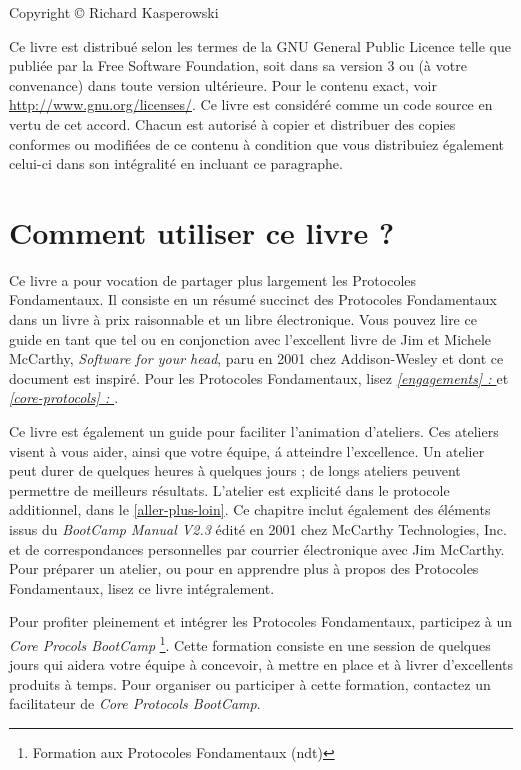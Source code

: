 \documentclass{book}
\newcommand*{\numref}[1]{{\hyperref[{#1}]{\autoref*{#1}}}}
\newcommand*{\fullref}[1]{\textit{\hyperref[{#1}]{\autoref*{#1} : \nameref*{#1}}}}
\begin{document}
Copyright \copyright{} Richard Kasperowski

Ce livre est distribué selon les termes de la GNU General Public Licence telle que publiée par la Free Software 
Foundation, soit dans sa version 3 ou (à votre convenance) dans toute version ultérieure. Pour le contenu exact, voir
\url{http://www.gnu.org/licenses/}. Ce livre est considéré comme un code source en vertu de cet accord. Chacun est autorisé
à copier et distribuer des copies conformes ou modifiées de ce contenu à condition que vous distribuiez également celui-ci
dans son intégralité en incluant ce paragraphe. 

\mainmatter

\chapter{Comment utiliser ce livre ?} \label{utiliser-ce-livre}

Ce livre a pour vocation de partager plus largement les Protocoles Fondamentaux. Il consiste en un résumé succinct des 
Protocoles Fondamentaux dans un livre à prix raisonnable et un libre électronique. Vous pouvez lire ce guide en tant que 
tel ou en conjonction avec l'excellent livre de Jim et Michele McCarthy, \emph{Software for your head}, paru en 2001
chez Addison-Wesley et dont ce document est inspiré. Pour les Protocoles Fondamentaux, lisez \fullref{engagements} et 
\fullref{core-protocols}. 

Ce livre est également un guide pour faciliter l'animation d'ateliers. Ces ateliers visent à vous aider, ainsi que 
votre équipe, á atteindre l'excellence. Un atelier peut durer de quelques heures à quelques jours ; de longs ateliers
peuvent permettre de meilleurs résultats. L'atelier est explicité dans le protocole additionnel, 
dans le \numref{aller-plus-loin}. Ce chapitre inclut également des éléments issus du \emph{BootCamp Manual V2.3} édité en 
2001 chez McCarthy Technologies, Inc. et de correspondances personnelles par courrier électronique avec Jim McCarthy. Pour 
préparer un atelier, ou pour en apprendre plus à propos des Protocoles Fondamentaux, lisez ce livre intégralement. 

Pour profiter pleinement et intégrer les Protocoles Fondamentaux, participez à un \emph{Core Procols BootCamp}
\footnote{Formation aux Protocoles Fondamentaux (ndt)}. Cette formation consiste en une session de quelques jours qui aidera
votre équipe à concevoir, à mettre en place et à livrer d'excellents produits à temps. Pour organiser ou participer à cette
formation, contactez un facilitateur de \emph{Core Protocols BootCamp}.
\end{document}
